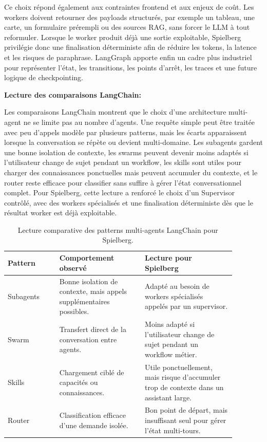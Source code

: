 \documentclass[a4paper,11pt,english,openany]{book}
\begin{document}
Ce choix répond également aux contraintes frontend et aux enjeux de coût. Les workers doivent retourner des payloads structurés, par exemple un tableau, une carte, un formulaire prérempli ou des sources RAG, sans forcer le LLM à tout reformuler. Lorsque le worker produit déjà une sortie exploitable, Spielberg privilégie donc une finalisation déterministe afin de réduire les tokens, la latence et les risques de paraphrase. LangGraph apporte enfin un cadre plus industriel pour représenter l'état, les transitions, les points d'arrêt, les traces et une future logique de checkpointing.

\textbf{Lecture des comparaisons LangChain:}

Les comparaisons LangChain montrent que le choix d'une architecture multi-agent ne se limite pas au nombre d'agents. Une requête simple peut être traitée avec peu d'appels modèle par plusieurs patterns, mais les écarts apparaissent lorsque la conversation se répète ou devient multi-domaine. Les subagents gardent une bonne isolation de contexte, les swarms peuvent devenir moins adaptés si l'utilisateur change de sujet pendant un workflow, les skills sont utiles pour charger des connaissances ponctuelles mais peuvent accumuler du contexte, et le router reste efficace pour classifier sans suffire à gérer l'état conversationnel complet. Pour Spielberg, cette lecture a renforcé le choix d'un Supervisor contrôlé, avec des workers spécialisés et une finalisation déterministe dès que le résultat worker est déjà exploitable.

\begingroup
\small
\renewcommand{\arraystretch}{1.18}
\setlength{\tabcolsep}{5pt}
\begin{longtable}{|L{0.20\linewidth}|L{0.33\linewidth}|L{0.35\linewidth}|}
\caption{Lecture comparative des patterns multi-agents LangChain pour Spielberg.}\\
\hline
\textbf{Pattern} & \textbf{Comportement observé} & \textbf{Lecture pour Spielberg}\\
\hline
Subagents
& Bonne isolation de contexte, mais appels supplémentaires possibles.
& Adapté au besoin de workers spécialisés appelés par un supervisor.\\
\hline
Swarm
& Transfert direct de la conversation entre agents.
& Moins adapté si l'utilisateur change de sujet pendant un workflow métier.\\
\hline
Skills
& Chargement ciblé de capacités ou connaissances.
& Utile ponctuellement, mais risque d'accumuler trop de contexte dans un assistant large.\\
\hline
Router
& Classification efficace d'une demande isolée.
& Bon point de départ, mais insuffisant seul pour gérer l'état multi-tours.\\
\hline
\end{longtable}
\endgroup
\end{document}
